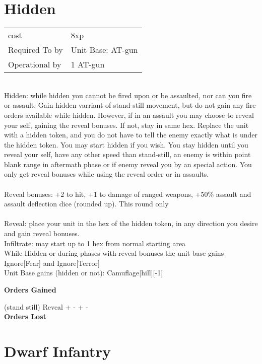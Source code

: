 \section{ Hidden }

\begin{tabular}{ll}
  cost & 8xp\\
  Required To by & Unit Base: AT-gun\\
  Operational by & 1 AT-gun\\

\end{tabular}
\ \\
Hidden: while hidden you cannot be fired upon or be assaulted, nor can you fire or assault. Gain hidden varriant of stand-still movement,  but do not gain any fire orders available while hidden. However, if in an assault you may choose to reveal your self, gaining the reveal bonuses. If not, stay in same hex. Replace the unit with a hidden token, and you do not have to tell the enemy exactly what is under the hidden token. You may start hidden if you wish. You stay hidden until you reveal your self, have any other speed than stand-still, an enemy is within point blank range in aftermath phase or if enemy reveal you by an special action. You only get reveal bonuses while using the reveal order or in assaults. \\ \ \\ Reveal bonuses: +2 to hit, +1 to damage of ranged weapons, +50\% assault and assault deflection dice (rounded up). This round only \\ \ \\ Reveal: place your unit in the hex of the hidden token, in any direction you desire and gain reveal bonuses.\\ Infiltrate: may start up to 1 hex from normal starting area\\ While Hidden or during phases with reveal bonuses the unit base gains Ignore[Fear] and Ignore[Terror] \\ Unit Base gains (hidden or not): Camuflage[hill][-1]

{\bf Orders Gained    }

\noindent (stand still) Reveal + - + - \\

{\bf Orders Lost }

\noindent 
\pagebreak

\section{ Dwarf Infantry }

